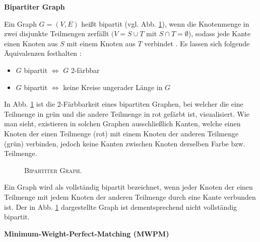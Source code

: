 \textbf{Bipartiter Graph}

Ein Graph $G = (V, E)$ heißt bipartit (vgl. Abb. \ref{fig:digression_bipartite_graph}), wenn die Knotenmenge in zwei disjunkte Teilmengen zerfällt
$(V = S \cup T$ mit $S \cap T = \emptyset$), sodass jede Kante einen Knoten aus $S$ mit einem Knoten aus $T$ verbindet \cite{HochschuleDarmstadt}.\newline
Es lassen sich folgende Äquivalenzen festhalten \cite{Leighton2010}:
\begin{itemize}
  \item $G$ bipartit $\iff$ $G$ 2-färbbar
  \item $G$ bipartit $\iff$ keine Kreise ungerader Länge in $G$
\end{itemize}
In Abb. \ref{fig:digression_bipartite_graph} ist die 2-Färbbarkeit eines bipartiten Graphen, bei welcher die eine Teilmenge
in grün und die andere Teilmenge in rot gefärbt ist, visualisiert. Wie man sieht, existieren in solchen Graphen
ausschließlich Kanten, welche einen Knoten der einen Teilmenge (rot) mit einem Knoten der anderen Teilmenge (grün) verbinden,
jedoch keine Kanten zwischen Knoten derselben Farbe bzw. Teilmenge.

\begin{figure}[H]
\centering
{}
\caption{\textsc{Bipartiter Graph.}}
\label{fig:digression_bipartite_graph}
\end{figure}

Ein Graph wird als vollständig bipartit bezeichnet, wenn jeder Knoten der einen Teilmenge mit jedem Knoten
der anderen Teilmenge durch eine Kante verbunden ist. Der in Abb. \ref{fig:digression_bipartite_graph}
dargestellte Graph ist dementsprechend nicht vollständig bipartit.

\textbf{Minimum-Weight-Perfect-Matching (\textsc{MWPM})}

